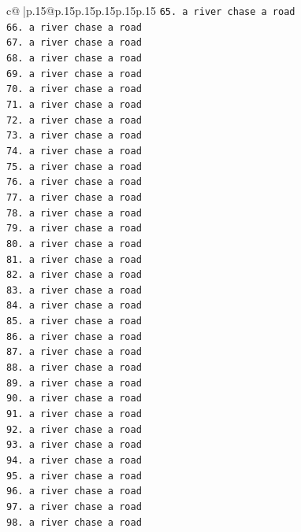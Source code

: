 \documentclass{article}
\begin{document}
{\begin{supertabular}{c@{$\;$}|p{.15\linewidth}@{}p{.15\linewidth}p{.15\linewidth}p{.15\linewidth}p{.15\linewidth}p{.15\linewidth}}
{{{\texttt{65. a river chase a road} \\
\texttt{66. a river chase a road} \\
\texttt{67. a river chase a road} \\
\texttt{68. a river chase a road} \\
\texttt{69. a river chase a road} \\
\texttt{70. a river chase a road} \\
\texttt{71. a river chase a road} \\
\texttt{72. a river chase a road} \\
\texttt{73. a river chase a road} \\
\texttt{74. a river chase a road} \\
\texttt{75. a river chase a road} \\
\texttt{76. a river chase a road} \\
\texttt{77. a river chase a road} \\
\texttt{78. a river chase a road} \\
\texttt{79. a river chase a road} \\
\texttt{80. a river chase a road} \\
\texttt{81. a river chase a road} \\
\texttt{82. a river chase a road} \\
\texttt{83. a river chase a road} \\
\texttt{84. a river chase a road} \\
\texttt{85. a river chase a road} \\
\texttt{86. a river chase a road} \\
\texttt{87. a river chase a road} \\
\texttt{88. a river chase a road} \\
\texttt{89. a river chase a road} \\
\texttt{90. a river chase a road} \\
\texttt{91. a river chase a road} \\
\texttt{92. a river chase a road} \\
\texttt{93. a river chase a road} \\
\texttt{94. a river chase a road} \\
\texttt{95. a river chase a road} \\
\texttt{96. a river chase a road} \\
\texttt{97. a river chase a road} \\
\texttt{98. a river chase a road} \\
}}}
\end{supertabular}}
\end{document}
